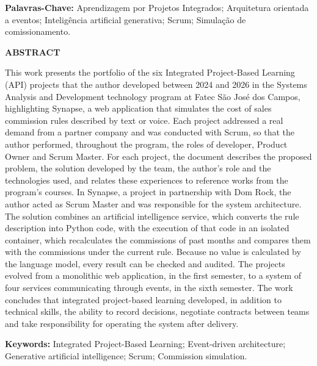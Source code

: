 \documentclass[12pt,a4paper]{article}
\newcommand{\titulocentralizado}[1]{\begin{center}\large\textbf{#1}\end{center}\vspace{12pt}}
\begin{document}
\vspace{12pt}
\noindent\textbf{Palavras-Chave:} Aprendizagem por Projetos Integrados; Arquitetura orientada a eventos; Inteligência artificial generativa; Scrum; Simulação de comissionamento.
\clearpage

\titulocentralizado{ABSTRACT}

\noindent This work presents the portfolio of the six Integrated Project-Based Learning (API) projects that the author developed between 2024 and 2026 in the Systems Analysis and Development technology program at Fatec São José dos Campos, highlighting Synapse, a web application that simulates the cost of sales commission rules described by text or voice. Each project addressed a real demand from a partner company and was conducted with Scrum, so that the author performed, throughout the program, the roles of developer, Product Owner and Scrum Master. For each project, the document describes the proposed problem, the solution developed by the team, the author's role and the technologies used, and relates these experiences to reference works from the program's courses. In Synapse, a project in partnership with Dom Rock, the author acted as Scrum Master and was responsible for the system architecture. The solution combines an artificial intelligence service, which converts the rule description into Python code, with the execution of that code in an isolated container, which recalculates the commissions of past months and compares them with the commissions under the current rule. Because no value is calculated by the language model, every result can be checked and audited. The projects evolved from a monolithic web application, in the first semester, to a system of four services communicating through events, in the sixth semester. The work concludes that integrated project-based learning developed, in addition to technical skills, the ability to record decisions, negotiate contracts between teams and take responsibility for operating the system after delivery.

\vspace{12pt}
\noindent\textbf{Keywords:} Integrated Project-Based Learning; Event-driven architecture; Generative artificial intelligence; Scrum; Commission simulation.
\clearpage

\tableofcontents
\clearpage
\end{document}
